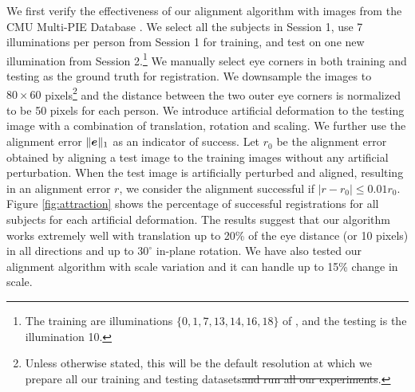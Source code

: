 \documentclass[12pt,journal,draftcls,letterpaper,onecolumn]{IEEEtran}
\providecommand{\DIFadd}[1]{{\protect\color{blue}\uwave{#1}}} %
\providecommand{\DIFdel}[1]{{\protect\color{red}\sout{#1}}}                      %
\providecommand{\DIFaddbegin}{} %
\providecommand{\DIFaddend}{} %
\providecommand{\DIFdelbegin}{} %
\providecommand{\DIFdelend}{} %
\begin{document}
\DIFdelbegin %
\DIFdelend \DIFaddbegin \noindent {\DIFadd{1) }\em \DIFadd{2D Deformation.}}  \DIFaddend We first verify the
    effectiveness of our alignment algorithm with images
    from the CMU Multi-PIE Database \cite{Gross2008-FGR}.
    We select all the subjects in Session 1, use 7
    illuminations per person from Session 1 for training,
    and test on one new illumination from Session
    2.\footnote{The training are illuminations $\{0, 1, 7,
    13, 14, 16, 18\}$ of \cite{Gross2008-FGR}, and the
    testing is the illumination 10. } We manually select
    eye corners in both training and testing as the ground
    truth for registration. We downsample the images to
    $80\times 60$ pixels\footnote{Unless otherwise stated,
    this will be the default resolution at which we prepare
    all our training and testing datasets\DIFdelbegin \DIFdel{and run all our
    experiments}\DIFdelend .} and the distance between the two outer
    eye corners is normalized to be 50 pixels for each
    person. We introduce artificial deformation to the
    testing image with a combination of translation,
    rotation and scaling. We further use the alignment
    error $\|\boldsymbol{e}\|_1$ as an indicator of success. Let $r_0$
    be the alignment error obtained by aligning a test
    image to the training images without any artificial
    perturbation. When the test image is artificially
    perturbed and aligned, resulting in an alignment error
    $r$, we consider the alignment successful if $|r - r_0 | \leq
    0.01r_0$. Figure \ref{fig:attraction} shows the
    percentage of successful registrations for all subjects
    for each artificial deformation. The results suggest
    that our algorithm works extremely well with
    translation up to 20\% of the eye distance (or 10
    pixels) in all directions and up to $30^\circ$ in-plane
    rotation. We have also tested our alignment algorithm
    with scale variation and it can handle up to 15\%
    change in scale.
\end{document}
